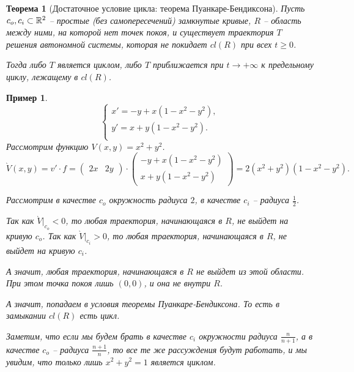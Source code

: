 \documentclass[a5paper, 10pt]{article}
\theoremstyle{definition}
\theoremstyle{plain}
\newtheorem{Th}{Теорема}
\newtheorem{Ex}{Пример}
\theoremstyle{remark}
\begin{document}
	\begin{Th}[Достаточное условие цикла: теорема Пуанкаре-Бендиксона]
		Пусть $c_o, c_i \subset \mathbb{R}^2$ -- простые (без самопересечений) замкнутые кривые, $R$ -- область между ними, на которой нет точек покоя, и существует траектория $T$ решения автономной системы, которая не покидает $cl(R)$ при всех $t\geqslant 0$.
		
		Тогда либо $T$ является циклом, либо $T$ приближается при $t\to +\infty$ к предельному циклу, лежащему в $cl(R)$.
	\end{Th}

	\begin{Ex}
		\[
		\begin{cases}
			x' = -y + x(1-x^2-y^2),\\
			y' = x + y(1-x^2-y^2).\\
		\end{cases}
		\]
		Рассмотрим функцию $V(x,y) = x^2+y^2$. 
		\[
		\grave{V}(x,y) = v'\cdot f = \begin{pmatrix}
			2x & 2y
		\end{pmatrix} \cdot \begin{pmatrix}
		-y + x(1-x^2-y^2)\\
		x + y(1-x^2-y^2)
		\end{pmatrix}
		= 2 (x^2+y^2)(1-x^2-y^2).
		\]
		
		Рассмотрим в качестве $c_o$ окружность радиуса $2$, в качестве $c_i$ -- радиуса $\frac12$. 
		
		Так как $\grave{V}|_{c_o} < 0$, то любая траектория, начинающаяся в $R$, не выйдет на кривую $c_o$.
		Так как $\grave{V}|_{c_i} > 0$, то любая траектория, начинающаяся в $R$, не выйдет на кривую $c_i$.
		
		А значит, любая траектория, начинающаяся в $R$ не выйдет из этой области.
		При этом точка покоя лишь $(0,0)$, и она не внутри $R$.
		
		А значит, попадаем в условия теоремы Пуанкаре-Бендиксона. То есть в замыкании $cl(R)$ есть цикл.
		
		Заметим, что если мы будем брать в качестве $c_i$ окружности радиуса $\frac{n}{n+1}$, а в качестве $c_o$ -- радиуса $\frac{n+1}{n}$, то все те же рассуждения будут работать, и мы увидим, что только лишь $x^2+y^2=1$ является циклом.
	\end{Ex}
\end{document}
